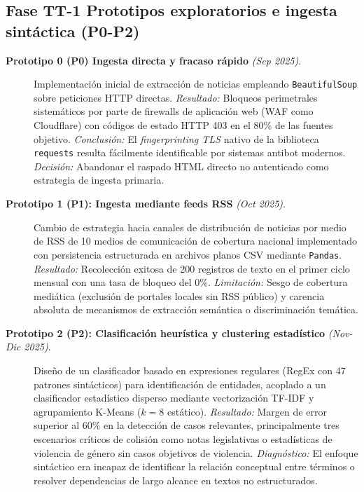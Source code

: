 \subsection{Fase TT-1 Prototipos exploratorios e ingesta sintáctica (P0-P2)}
\label{subsec:met_tt1_prototipos}

\begin{description}
    \item[\textbf{Prototipo 0 (P0) Ingesta directa y fracaso rápido} \textit{(Sep 2025)}.] 
          Implementación inicial de extracción de noticias empleando \texttt{BeautifulSoup} sobre peticiones HTTP directas. 
          \textit{Resultado:} Bloqueos perimetrales sistemáticos por parte de firewalls de aplicación web (WAF como Cloudflare) con códigos de estado HTTP 403 en el 80\% de las fuentes objetivo. 
          \textit{Conclusión:} El \textit{fingerprinting TLS} nativo de la biblioteca \texttt{requests} resulta fácilmente identificable por sistemas antibot modernos. 
          \textit{Decisión:} Abandonar el raspado HTML directo no autenticado como estrategia de ingesta primaria.

    \item[\textbf{Prototipo 1 (P1): Ingesta mediante feeds RSS} \textit{(Oct 2025)}.]  
          Cambio de estrategia hacia canales de distribución de noticias por medio de RSS de 10 medios de comunicación de cobertura nacional implementado con persistencia estructurada en archivos
          planos CSV mediante \texttt{Pandas}. 
          \textit{Resultado:} Recolección exitosa de 200 registros de texto en el primer ciclo mensual con una tasa de bloqueo del 0\%. 
          \textit{Limitación:} Sesgo de cobertura mediática (exclusión de portales locales sin RSS público) y carencia absoluta de mecanismos de extracción semántica o discriminación temática.

    \item[\textbf{Prototipo 2 (P2): Clasificación heurística y clustering estadístico} \textit{(Nov-Dic 2025)}.] 
          Diseño de un clasificador basado en expresiones regulares (RegEx con 47 patrones sintácticos) para identificación de entidades, acoplado a un clasificador
          estadístico disperso mediante vectorización TF-IDF y agrupamiento K-Means ($k=8$ estático). 
          \textit{Resultado:} Margen de error superior al 60\% en la detección de casos relevantes, principalmente tres escenarios críticos de colisión como notas legislativas o estadísticas
          de violencia de género sin casos objetivos de violencia.
          \textit{Diagnóstico:} El enfoque sintáctico era incapaz de identificar la relación conceptual entre términos o resolver dependencias de largo alcance en textos no estructurados.
\end{description}

